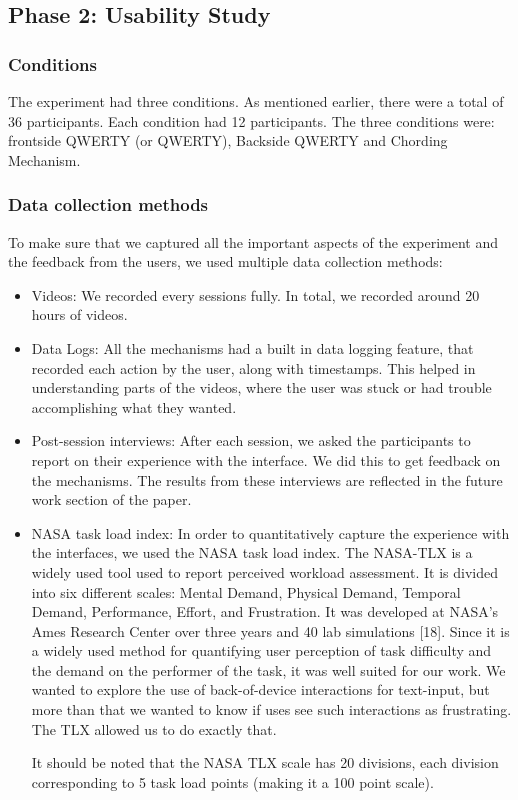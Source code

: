 \subsection{Phase 2: Usability Study}
\subsubsection{Conditions}

The experiment had three conditions. As mentioned earlier, there were
a total of 36 participants. Each condition had 12 participants. The
three conditions were: frontside QWERTY (or QWERTY), Backside QWERTY
and Chording Mechanism.

\subsubsection{Data collection methods}

To make sure that we captured all the important aspects of the
experiment and the feedback from the users, we used multiple data
collection methods:

\begin{itemize}
\item Videos: We recorded every sessions fully. In total, we recorded
  around 20 hours of videos.
\item Data Logs: All the mechanisms had a built in data logging
  feature, that recorded each action by the user, along with
  timestamps. This helped in understanding parts of the videos, where
  the user was stuck or had trouble accomplishing what they wanted.
\item Post-session interviews: After each session, we asked the
  participants to report on their experience with the interface. We
  did this to get feedback on the mechanisms.  The results from
  these interviews are reflected in the future work section of the
  paper.
\item NASA task load index: In order to quantitatively capture the
  experience with the interfaces, we used the NASA task load
  index. The NASA-TLX is a widely used tool used to report perceived
  workload assessment. It is divided into six different scales: Mental
  Demand, Physical Demand, Temporal Demand, Performance, Effort, and
  Frustration. It was developed at NASA's Ames Research Center over
  three years and 40 lab simulations [18]. Since it is a widely used
  method for quantifying user perception of task difficulty and the
  demand on the performer of the task, it was well suited for our
  work. We wanted to explore the use of back-of-device interactions
  for text-input, but more than that we wanted to know if uses see
  such interactions as frustrating. The TLX allowed us to do exactly
  that.

  It should be noted that the NASA TLX scale has 20 divisions, each
  division corresponding to 5 task load points (making it a 100 point
  scale).

\end{itemize}


